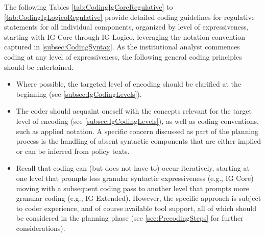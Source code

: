 \sp

The following Tables \ref{tab:CodingIgCoreRegulative} to \ref{tab:CodingIgLogicoRegulative} provide detailed coding guidelines for regulative statements for all individual components, organized by level of expressiveness, starting with IG Core through IG Logico, leveraging the notation convention captured in \cref{subsec:CodingSyntax}. As the institutional analyst commences coding at any level of expressiveness, the following general coding principles should be entertained.

\begin{itemize}
    \item Where possible, the targeted level of encoding should be clarified at the beginning (see \cref{subsec:IgCodingLevels}).
    \item The coder should acquaint oneself with the concepts relevant for the target level of encoding (see \cref{subsec:IgCodingLevels}), as well as coding conventions, such as applied notation. A specific concern discussed as part of the planning process is the handling of absent syntactic components that are either implied or can be inferred from policy texts.
    \item Recall that coding can (but does not have to) occur iteratively, starting at one level that prompts less granular syntactic expressiveness (e.g., IG Core) moving with a subsequent coding pass to another level that prompts more granular coding (e.g., IG Extended). However, the specific approach is subject to coder experience, and of course available tool support, all of which should be considered in the planning phase (see \cref{sec:PrecodingSteps} for further considerations). 
\end{itemize}

\newpage


